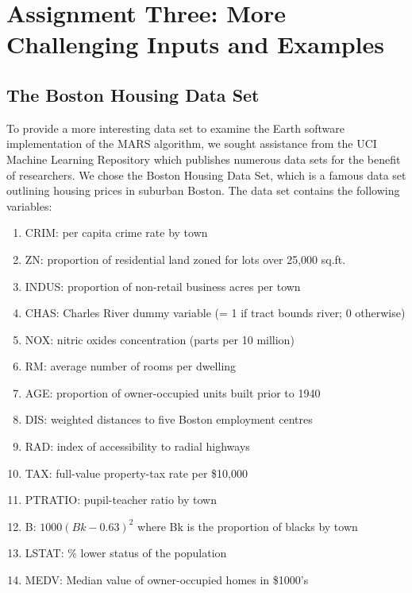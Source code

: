 

\graphicspath{{C:/Documents and Settings/amcelhinney/My Documents/GitHub/MCS507ProjectTwo/tex/include/}}

\section{Assignment Three: More Challenging Inputs and Examples} %
\label{sec: First}


\subsection{The Boston Housing Data Set} %
\label{sub:methoda}
To provide a more interesting data set to examine the Earth software implementation of the MARS algorithm, we sought assistance from the UCI Machine Learning Repository which publishes numerous data sets for the benefit of researchers. We chose the Boston Housing Data Set, which is a famous data set outlining housing prices in suburban Boston. The data set contains the following variables:

\begin{enumerate}
\item CRIM: per capita crime rate by town
\item ZN: proportion of residential land zoned for lots over 25,000 sq.ft.
\item INDUS: proportion of non-retail business acres per town
\item CHAS: Charles River dummy variable (= 1 if tract bounds river; 0 otherwise)
\item NOX: nitric oxides concentration (parts per 10 million)
\item RM: average number of rooms per dwelling
\item AGE: proportion of owner-occupied units built prior to 1940
\item DIS: weighted distances to five Boston employment centres
\item RAD: index of accessibility to radial highways
\item TAX: full-value property-tax rate per \$10,000
\item PTRATIO: pupil-teacher ratio by town
\item B: $1000(Bk - 0.63)^{2}$ where Bk is the proportion of blacks by town
\item LSTAT: \% lower status of the population
\item MEDV: Median value of owner-occupied homes in \$1000's
\end{enumerate}

